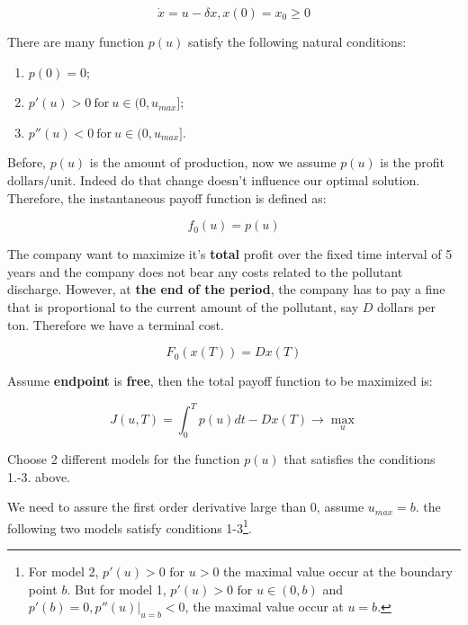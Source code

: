 \documentclass{article}
\begin{document}
\begin{equation}\label{cd:initial_condition}
    \dot{x}=u-\delta x, x(0)=x_0 \geq 0
\end{equation}

There are many function $p(u)$ satisfy the following natural conditions:

\begin{enumerate}
    \item $p(0)=0$;
    \item $p'(u)>0\ \text{for}\ u\in(0,u_{max}]$;
    \item $p''(u)<0\ \text{for}\ u\in(0,u_{max}]$.
\end{enumerate}

Before, $p(u)$ is the amount of production, now we assume $p(u)$ is the profit $\text{dollars/unit}$. Indeed do that change doesn't influence our optimal solution. Therefore, the instantaneous payoff function is defined as:

\begin{equation}\label{eq:payoff_funtion_instant}
    f_0(u)=p(u)
\end{equation}

The company want to maximize it's \textbf{total} profit over the fixed time interval of 5 years and the company does not bear any costs related to the pollutant discharge. However, at \textbf{the end of the period}, the company has to pay a fine that is proportional to the current amount of the pollutant, say $D$ dollars per ton. Therefore we have a terminal cost.

\begin{equation}\label{eq:terminal_cost}
    F_0(x(T))=Dx(T)
\end{equation}


Assume \textbf{endpoint} is \textbf{free}, then the total payoff function to be maximized is:

\begin{equation}\label{eq:optfunction_with_terminal_cost}
    J(u,T)=\int_{0}^{T}p(u)dt-Dx(T)\rightarrow \max_{u} 
\end{equation}

 Choose 2 different models for the function $p(u)$ that satisfies the conditions 1.-3. above.

We need to assure the first order derivative large than $0$, assume $u_{max}=b$. the following two models satisfy conditions 1-3\footnote{For model 2, $p'(u)>0 \text{ for } u>0$ the maximal value occur at the boundary point $b$. But for model 1, $p'(u)>0 \text{ for } u\in(0,b)$ and $p'(b)=0, p''(u)|_{u=b}<0$, the maximal value occur at $u=b$.}. 
\end{document}
